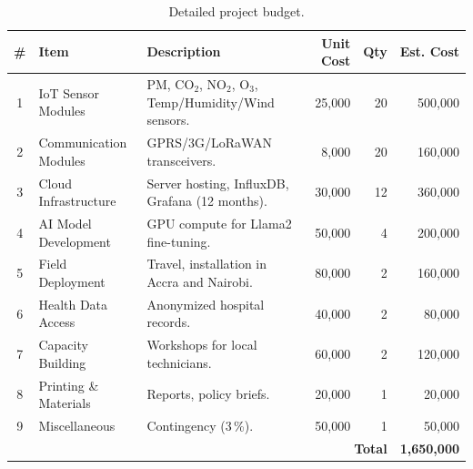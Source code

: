 \documentclass[12pt,a4paper]{report}
\begin{document}
\begin{table}[htbp]
  \centering
  \caption{Detailed project budget.}
  \label{tab:budget}
  \begin{tabular}{clp{5cm}rrr}
    \toprule
    \textbf{\#} & \textbf{Item} & \textbf{Description} & \textbf{Unit Cost} & \textbf{Qty} & \textbf{Est. Cost}\\
    \midrule
    1 & IoT Sensor Modules & PM, CO$_2$, NO$_2$, O$_3$, Temp/Humidity/Wind sensors. & 25,000 & 20 & 500,000 \\
    2 & Communication Modules & GPRS/3G/LoRaWAN transceivers. & 8,000 & 20 & 160,000 \\
    3 & Cloud Infrastructure & Server hosting, InfluxDB, Grafana (12 months). & 30,000 & 12 & 360,000 \\
    4 & AI Model Development & GPU compute for Llama2 fine-tuning. & 50,000 & 4 & 200,000 \\
    5 & Field Deployment & Travel, installation in Accra and Nairobi. & 80,000 & 2 & 160,000 \\
    6 & Health Data Access & Anonymized hospital records. & 40,000 & 2 & 80,000 \\
    7 & Capacity Building & Workshops for local technicians. & 60,000 & 2 & 120,000 \\
    8 & Printing \& Materials & Reports, policy briefs. & 20,000 & 1 & 20,000 \\
    9 & Miscellaneous & Contingency (3\,\%). & 50,000 & 1 & 50,000 \\
    \midrule
    \multicolumn{5}{r}{\textbf{Total}} & \textbf{1,650,000} \\
    \bottomrule
  \end{tabular}
\end{table}



\end{document}
